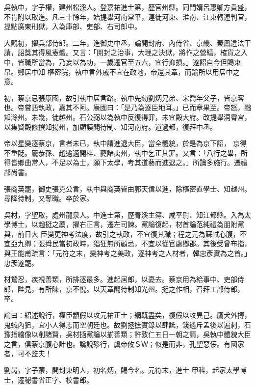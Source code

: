 \begin{pinyinscope}
 吳執中，字子權，建州松溪人。登嘉祐進士第，歷官州縣。同門婿呂惠卿方貴盛，不肯附以取進。凡三十餘年，始提舉河南常平，連徙河東、淮南、江東轉運判官，提點廣東刑獄，入為庫部、吏部、右司郎中。



 大觀初，擢兵部侍郎。二年，進御史中丞，論開封府、內侍省、京畿、秦鳳違法干請，詔獎其得風憲體。又言：「開封之治事，大理之決獄，將作之營繕，榷貨之入中，皆職所當為，乃妄以為功，一歲遷官至五六，宜行抑損。」遂詔自今但賜束帛。鄭居中知
 樞密院，執中言外戚不宜在政地，帝還其章，而諭所以用居中之意。



 初，蔡京忌張康國，故引執中居言路。執中先劾劉炳兄弟、宋喬年父子，皆京客也。帝嘗語執政，嘉其不阿。康國曰：「是乃為逐臣地耳。」已而章果至。帝怒，黜知滁州。未幾，徙越州。石公弼以為執中反復得罪，未宜殿大府。改提舉洞霄宮，以集賢殿修撰知揚州，加顯謨閣待制、知河南府。道過都，復拜中丞。



 帝以星變逐蔡京，言者未已，執中謂進退大臣，當全體貌，於是為京下詔，
 京得不重貶。龐恭孫、趙遹適開梓、夔諸夷州，執中乞正其罪。又言：「八行之舉，所得皆鄉曲常人，不足以為士，願下太學，考其道藝而進退之。」所論多施行。遷禮部尚書。



 張商英罷，御史張克公言，執中與商英皆由郭天信以進，除樞密直學士、知越州。尋降待制，又奪職。卒於家。



 吳材，字聖取，處州龍泉人。中進士第，歷青溪主簿、咸平尉、知江都縣。入為太學博士，以趙挺之薦，擢右正言，遷左司諫。黨論復起，材首論范純禮為朋附黨與，前日大
 臣變更神考法度，故引之執政，不宜復其職；程之元為蘇軾心腹，不宜亞九卿；張舜民當初政時，猖狂無所顧忌，不宜以從官處鄉郡。其後受曾布指，與王能甫疏言：「元符之末，變神考之美政，逐神考之人材者，韓忠彥實為之首。」忠彥遂罷。



 材鷙忍，疾視善類，所排逐最多。進起居郎，以憂去。蔡京用為給事中、吏部侍郎，陛見，有所陳，京不悅。以天章閣待制知光州。挺之作相，召拜工部侍郎，卒。



 論曰：紹述說行，權臣顓假以攻元祐正士；網既盡矣，復假以攻異己。鷹犬外搏，鬼蜮內狙，宜小人得志而空朝廷也。故劉拯摭實錄以肆詆，錢遹斥孟後以遍刺，石豫指繪像以削諸賢，吳材擿黨論以揃善類；許敦仁五日一朝之請，吳執中體貌大臣之言，俱蔡京腹心計也。讒說殄行，虞帝攸ＳＷ；似是而非，孔聖惡佞。有國家者，可不監夫！



 劉昺，字子蒙，開封東明人，初名炳，賜今名。元符末，進士
 甲科，起家太學博士，遷秘書省正字、校書郎。




\end{pinyinscope}
